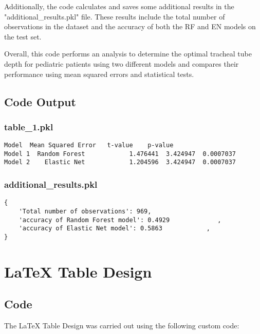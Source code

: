 \documentclass[11pt]{article}
\begin{document}
Additionally, the code calculates and saves some additional results in the "additional\_results.pkl" file. These results include the total number of observations in the dataset and the accuracy of both the RF and EN models on the test set.

Overall, this code performs an analysis to determine the optimal tracheal tube depth for pediatric patients using two different models and compares their performance using mean squared errors and statistical tests.

\subsection{Code Output}

\subsubsection*{table\_1.pkl}

\begin{Verbatim}[tabsize=4]
                 Model  Mean Squared Error   t-value    p-value
Model 1  Random Forest            1.476441  3.424947  0.0007037
Model 2    Elastic Net            1.204596  3.424947  0.0007037
\end{Verbatim}

\subsubsection*{additional\_results.pkl}

\begin{Verbatim}[tabsize=4]
{
    'Total number of observations': 969,
    'accuracy of Random Forest model': 0.4929             ,
    'accuracy of Elastic Net model': 0.5863            ,
}
\end{Verbatim}

\section{LaTeX Table Design}
\subsection{{Code}}
The LaTeX Table Design was carried out using the following custom code:
\end{document}
